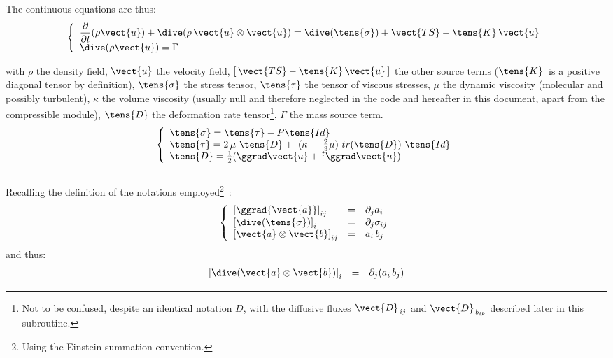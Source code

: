 The continuous equations are thus:
\begin{equation}
\left\{\begin{array}{l}
\displaystyle\frac{\partial}{\partial t}(\rho \vect{u}) + \dive(\rho\, \vect{u} \otimes \vect{u})
=\dive(\tens{\sigma}) + \vect{TS} - \tens{K}\,\vect{u}\\
\dive(\rho \vect{u}) = \Gamma
\end{array}\right.
\end{equation}




with $\rho$ the density field, $\vect{u}$ the velocity field,
$[\,\vect{TS}-\tens{K}\,\vect{u}\,]$ the other source terms ($\tens{K}$~is a
positive diagonal tensor by definition), $\tens{\sigma}$ the stress tensor,
$\tens{\tau}$ the tensor of viscous stresses,
$\mu$ the dynamic viscosity (molecular and possibly turbulent),
$\kappa$ the volume viscosity (usually null and therefore neglected in
the code and hereafter in this document, apart from the compressible module),
$\tens{D}$ the deformation rate tensor\footnote{Not to be confused,
despite an identical notation $D$, with the diffusive fluxes
$\vect{D}_{\,ij}$ and $\vect{D}_{\,{b}_{ik}}$ described later in this
subroutine.}, $\Gamma$ the mass source term.
\begin{equation}
\left\{\begin{array}{l}
\tens{\sigma} = \tens{\tau} - P\tens{Id}  \\
\tens{\tau} = 2\,\mu\ \tens{D} +\ (\kappa\ - \frac{2}{3}\mu)\  tr({\tens{D}})\
\tens{Id}  \\
\tens{D} = \frac{1}{2}(\ggrad\vect{u}+\,^{t}\ggrad\vect{u})
\end{array}\right.
\end{equation}
 \\

Recalling the definition of the notations employed\footnote{Using the
Einstein summation convention.}~:
\begin{equation}\notag
\left\{\begin{array}{lll}
\left[\ggrad{\vect{a}}\right]_{ij} &=& \partial_j a_i\\
\left[\dive(\tens{\sigma})\right]_i &=& \partial_j \sigma_{ij}\\
\left[\vect{a}\otimes\vect{b}\right]_{ij} &= &
a_i\,b_j\\
\end{array}\right.
\end{equation}
and thus:
\begin{equation}\notag
\begin{array}{lll}
\left[\dive(\vect{a}\otimes\vect{b})\right]_i &= &
\partial_j (a_i\,b_j)
\end{array}
\end{equation}

